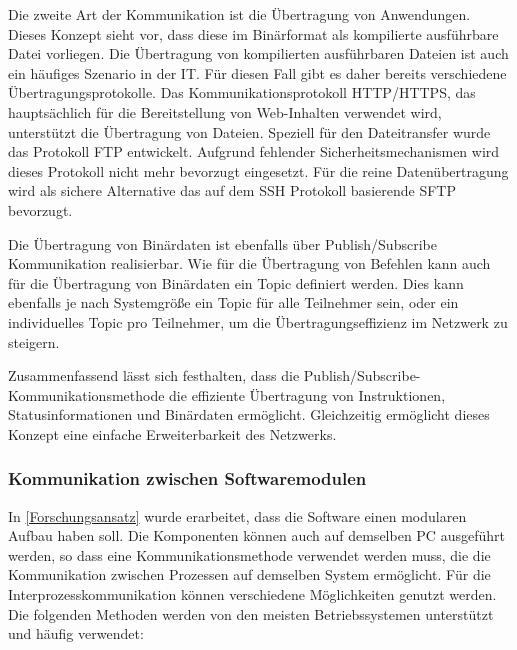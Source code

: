 Die zweite Art der Kommunikation ist die Übertragung von Anwendungen. Dieses Konzept sieht vor, dass diese im Binärformat als kompilierte ausführbare Datei vorliegen. Die Übertragung von kompilierten ausführbaren Dateien ist auch ein häufiges Szenario in der \gls{IT}. Für diesen Fall gibt es daher bereits verschiedene Übertragungsprotokolle. Das Kommunikationsprotokoll \gls{HTTP}/\gls{HTTPS}, das hauptsächlich für die Bereitstellung von Web-Inhalten verwendet wird, unterstützt die Übertragung von Dateien. Speziell für den Dateitransfer wurde das Protokoll \gls{FTP} entwickelt. Aufgrund fehlender Sicherheitsmechanismen wird dieses Protokoll nicht mehr bevorzugt eingesetzt. Für die reine Datenübertragung wird als sichere Alternative das auf dem \gls{SSH} Protokoll basierende \gls{SFTP} bevorzugt.

Die Übertragung von Binärdaten ist ebenfalls über Publish/Subscribe Kommunikation realisierbar. Wie für die Übertragung von Befehlen kann auch für die Übertragung von Binärdaten ein Topic definiert werden. Dies kann ebenfalls je nach Systemgröße ein Topic für alle Teilnehmer sein, oder ein individuelles Topic pro Teilnehmer, um die Übertragungseffizienz im Netzwerk zu steigern. 

Zusammenfassend lässt sich festhalten, dass die Publish/Subscribe-Kommunikationsmethode die effiziente Übertragung von Instruktionen, Statusinformationen und Binärdaten ermöglicht. Gleichzeitig ermöglicht dieses Konzept eine einfache Erweiterbarkeit des Netzwerks.

\subsubsection{Kommunikation zwischen Softwaremodulen}
\label{Kommunikation zwischen Softwaremodulen}

In \autoref{Forschungsansatz} wurde erarbeitet, dass die Software einen modularen Aufbau haben soll. Die Komponenten können auch auf demselben PC ausgeführt werden, so dass eine Kommunikationsmethode verwendet werden muss, die die Kommunikation zwischen Prozessen auf demselben System ermöglicht. Für die Interprozesskommunikation können verschiedene Möglichkeiten genutzt werden. Die folgenden Methoden werden von den meisten Betriebssystemen unterstützt und häufig verwendet:

